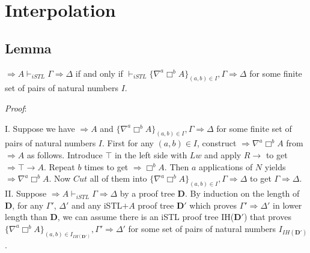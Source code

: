 \section{Interpolation}

\subsection{Lemma}\label{lem:vdash} $\Rightarrow A \vdash_{iSTL} \Gamma \Rightarrow \Delta$ if and only if $\vdash_{iSTL} \{ \nabla^a \Box^b A\}_{(a,b) \in I} , \Gamma \Rightarrow \Delta$ for some finite set of pairs of natural numbers $I$.

\textit{Proof}:

I. Suppose we have $\Rightarrow A$ and $\{ \nabla^a \Box^b A\}_{(a,b) \in I} , \Gamma \Rightarrow \Delta$ for some finite set of pairs of natural numbers $I$. First for any $(a,b) \in I$, construct $\Rightarrow \nabla^a \Box^b A$ from $\Rightarrow A$ as follows. Introduce $\top$ in the left side with $Lw$ and apply $R\rightarrow$ to get $\Rightarrow \top \rightarrow A$. Repeat $b$ times to get $\Rightarrow \Box^b A$. Then $a$ applications of $N$ yields $\Rightarrow \nabla^a \Box^b A$. Now $Cut$ all of them into $\{ \nabla^a \Box^b A\}_{(a,b) \in I} , \Gamma \Rightarrow \Delta$ to get $\Gamma \Rightarrow \Delta$. \\

II. Suppose $\Rightarrow A \vdash_{iSTL} \Gamma \Rightarrow \Delta$ by a proof tree $\mathbf{D}$. By induction on the length of $\mathbf{D}$, for any $\Gamma'$, $\Delta'$ and any iSTL$+A$ proof tree $\mathbf{D}'$ which proves $\Gamma' \Rightarrow \Delta'$ in lower length than $\mathbf{D}$, we can assume there is an iSTL proof tree IH($\mathbf{D}'$) that proves $\{\nabla^a \Box^b A\}_{(a,b) \in I_{IH(\mathbf{D}')}} , \Gamma' \Rightarrow \Delta'$ for some set of pairs of natural numbers $I_{IH(\mathbf{D}')}$.


